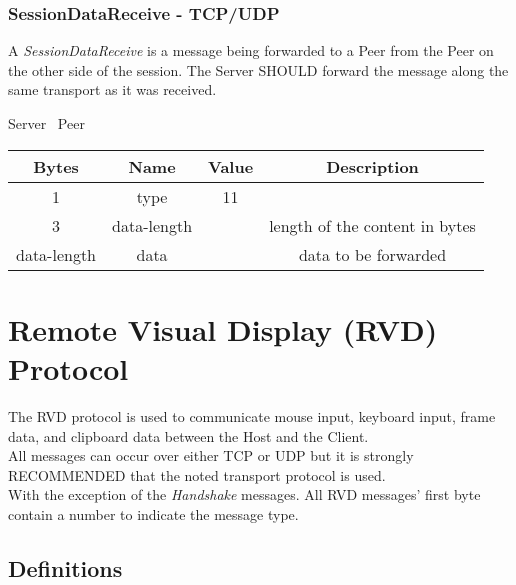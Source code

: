 \documentclass{article}
\begin{document}
    \subsubsection{SessionDataReceive - TCP/UDP}

    A \emph{SessionDataReceive} is a message being forwarded to a Peer from the Peer on the other side of the
    session. The Server SHOULD forward the message along the same transport as it was received.

    \begin{center}
        Server \textrightarrow\ Peer\\
        \begin{tabular}{|c|c|c|c|}
            \hline
            \textbf{Bytes} & \textbf{Name} & \textbf{Value} & \textbf{Description}           \\
            \hline
            1              & type          & 11             &                                \\
            \hline
            3              & data-length   &                & length of the content in bytes \\
            \hline
            data-length    & data          &                & data to be forwarded           \\
            \hline
        \end{tabular}
    \end{center}

    \newpage


    \section{Remote Visual Display (RVD) Protocol}

    The RVD protocol is used to communicate mouse input, keyboard input, frame data, and clipboard data between the
    Host and the Client.\\

    All messages can occur over either TCP or UDP but it is strongly RECOMMENDED that the noted transport protocol is
    used.\\

    With the exception of the \emph{Handshake} messages. All RVD messages' first byte contain a number to indicate
    the message type.

    \subsection{Definitions}
\end{document}
